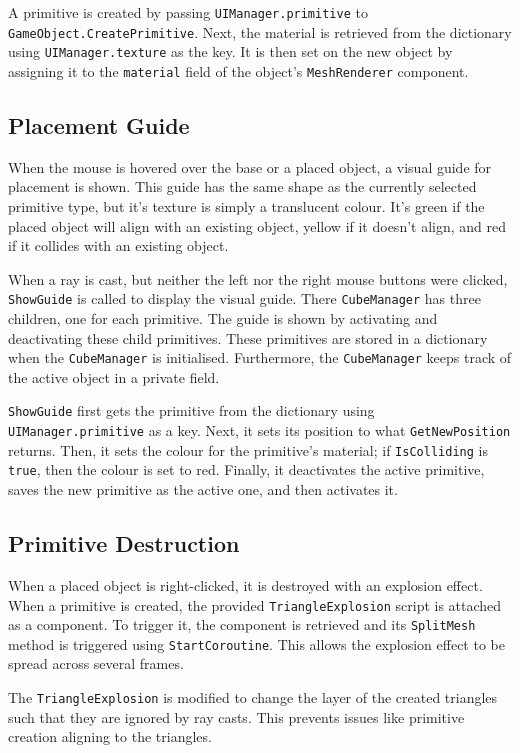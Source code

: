 \documentclass[a4paper, 12pt]{scrartcl}
\begin{document}
A primitive is created by passing \texttt{UIManager.primitive} to \texttt{GameObject.CreatePrimitive}. Next, the material is retrieved from the dictionary using \texttt{UIManager.texture} as the key. It is then set on the new object by assigning it to the \texttt{material} field of the object's \texttt{MeshRenderer} component.

\subsection{Placement Guide}
When the mouse is hovered over the base or a placed object, a visual guide for placement is shown. This guide has the same shape as the currently selected primitive type, but it's texture is simply a translucent colour. It's green if the placed object will align with an existing object, yellow if it doesn't align, and red if it collides with an existing object.

When a ray is cast, but neither the left nor the right mouse buttons were clicked, \texttt{ShowGuide} is called to display the visual guide. There \texttt{CubeManager} has three children, one for each primitive. The guide is shown by activating and deactivating these child primitives. These primitives are stored in a dictionary when the \texttt{CubeManager} is initialised. Furthermore, the \texttt{CubeManager} keeps track of the active object in a private field.

\texttt{ShowGuide} first gets the primitive from the dictionary using \texttt{UIManager.primitive} as a key. Next, it sets its position to what \texttt{GetNewPosition} returns. Then, it sets the colour for the primitive's material; if \texttt{IsColliding} is \texttt{true}, then the colour is set to red. Finally, it deactivates the active primitive, saves the new primitive as the active one, and then activates it.

\subsection{Primitive Destruction}
When a placed object is right-clicked, it is destroyed with an explosion effect. When a primitive is created, the provided \texttt{TriangleExplosion} script is attached as a component. To trigger it, the component is retrieved and its \texttt{SplitMesh} method is triggered using \texttt{StartCoroutine}. This allows the explosion effect to be spread across several frames.

The \texttt{TriangleExplosion} is modified to change the layer of the created triangles such that they are ignored by ray casts. This prevents issues like primitive creation aligning to the triangles.
\end{document}
